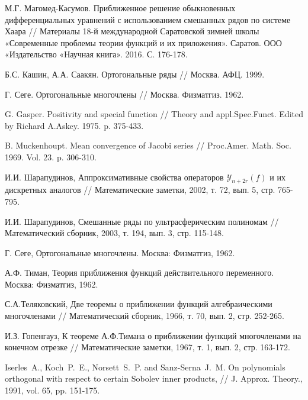 \begin{thebibliography}{999}
 М.Г. Магомед-Касумов. Приближенное решение обыкновенных дифференциальных уравнений с использованием смешанных рядов по системе Хаара // Материалы 18-й международной Саратовской зимней школы «Современные проблемы теории функций и их приложения». Саратов. ООО «Издательство «Научная книга». 2016. С. 176-178.


 Б.С. Кашин, А.А. Саакян. Ортогональные ряды // Москва. АФЦ. 1999.


 Г. Сеге. Ортогональные многочлены // Москва. Физматгиз. 1962.


 G. Gasper. Positivity and special function // Theory and appl.Spec.Funct. Edited by Richard A.Askey. 1975. p. 375-433.


 B. Muckenhoupt. Mean convergence of Jacobi series // Proc.Amer. Math. Soc. 1969. Vol. 23.  p. 306-310.




 И.И. Шарапудинов, Аппроксимативные свойства операторов $\mathcal{Y}_{n+2r}(f)$ и их дискретных аналогов // Математические заметки, 2002, т. 72, вып. 5, стр. 765-795.


 И.И. Шарапудинов, Смешанные ряды по ультрасферическим полиномам // Математический сборник, 2003, т. 194, вып. 3, стр. 115-148.





 Г. Сеге, Ортогональные многочлены. Москва: Физматгиз, 1962.


 А.Ф. Тиман, Теория приближения функций действительного переменного. Москва: Физматгиз, 1962.


 С.А.Теляковский, Две теоремы о приближении функций
алгебраическими многочленами // Математический сборник, 1966, т. 70, вып. 2, стр. 252-265.


 И.З. Гопенгауз, К теореме А.Ф.Тимана о приближении
функций многочленами на конечном отрезке // Математические заметки, 1967, т. 1, вып. 2, стр. 163-172.


 Iserles~A., Koch~P.~E., Norsett~S.~P. and Sanz-Serna~J.~M. On polynomials orthogonal with respect to certain Sobolev inner products, // J. Approx. Theory., 1991, vol. 65, pp. 151-175.



\end{thebibliography}
